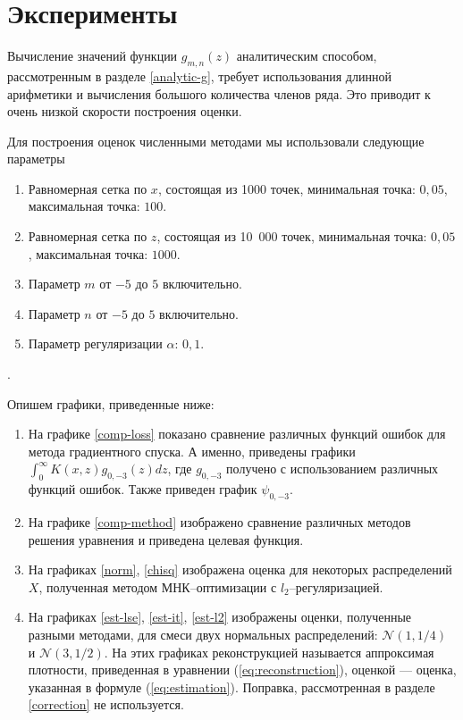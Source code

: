 \documentclass[../paper.tex]{subfiles}
\begin{document}
\section{Эксперименты}
%
Вычисление значений функции $g_{m,n}(z)$ аналитическим способом, рассмотренным в разделе \ref{analytic-g}, требует использования длинной арифметики
и вычисления большого количества членов ряда. Это приводит к очень низкой скорости построения оценки. 

Для построения оценок численными методами мы использовали следующие параметры
\begin{enumerate}
	\item Равномерная сетка по $x$, состоящая из 1000 точек, минимальная точка: $0{,}05$, максимальная точка: $100$.
	\item Равномерная сетка по $z$, состоящая из 10~000 точек, минимальная точка: $0{,}05$, максимальная точка: $1000$.
	\item Параметр $m$ от $-5$ до $5$ включительно.
	\item Параметр $n$ от $-5$ до $5$ включительно.
	\item Параметр регуляризации $\alpha$: $0{,}1$.
\end{enumerate}.

Опишем графики, приведенные ниже:
\begin{enumerate}
	\item На графике \ref{comp-loss} показано сравнение различных функций ошибок для метода градиентного спуска.
		А именно, приведены графики $\int_0^\infty K(x,z)g_{0,-3}(z)dz$, где $g_{0,-3}$ получено с использованием различных функций ошибок.
		Также приведен график $\psi_{0,-3}$.
	\item На графике \ref{comp-method} изображено сравнение различных методов решения уравнения и приведена целевая функция.
	\item На графиках \ref{norm}, \ref{chisq} изображена оценка для некоторых распределений $X$, полученная методом МНК--оптимизации с $l_2$--регуляризацией.
	\item На графиках \ref{est-lse}, \ref{est-it}, \ref{est-l2} изображены оценки, 
		полученные разными методами, для смеси двух нормальных распределений: $\mathcal{N}(1, 1/4)$ и $\mathcal{N}(3, 1/2)$.
		На этих графиках реконструкцией называется аппроксимая плотности, приведенная в уравнении (\ref{eq:reconstruction}), оценкой --- оценка, указанная в формуле (\ref{eq:estimation}). Поправка, рассмотренная в разделе \ref{correction} не используется.
\end{enumerate}
\end{document}
